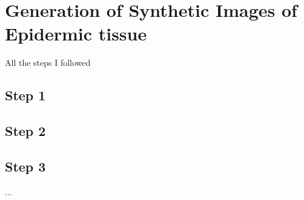 \section{Generation of Synthetic Images of Epidermic tissue}
All the steps I followed

\subsection{Step 1}

\subsection{Step 2}

\subsection{Step 3}

...

